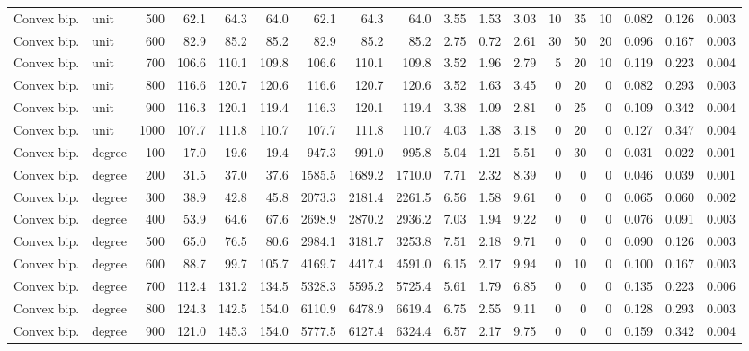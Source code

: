 \begin{tabular}{llr rrr rrr rrr rrr rrr}
Convex bip. & unit & 500 & 62.1 & 64.3 & 64.0 & 62.1 & 64.3 & 64.0 & 3.55 & 1.53 & 3.03 & 10 & 35 & 10 & 0.082 & 0.126 & 0.003 \\
Convex bip. & unit & 600 & 82.9 & 85.2 & 85.2 & 82.9 & 85.2 & 85.2 & 2.75 & 0.72 & 2.61 & 30 & 50 & 20 & 0.096 & 0.167 & 0.003 \\
Convex bip. & unit & 700 & 106.6 & 110.1 & 109.8 & 106.6 & 110.1 & 109.8 & 3.52 & 1.96 & 2.79 & 5 & 20 & 10 & 0.119 & 0.223 & 0.004 \\
Convex bip. & unit & 800 & 116.6 & 120.7 & 120.6 & 116.6 & 120.7 & 120.6 & 3.52 & 1.63 & 3.45 & 0 & 20 & 0 & 0.082 & 0.293 & 0.003 \\
Convex bip. & unit & 900 & 116.3 & 120.1 & 119.4 & 116.3 & 120.1 & 119.4 & 3.38 & 1.09 & 2.81 & 0 & 25 & 0 & 0.109 & 0.342 & 0.004 \\
Convex bip. & unit & 1000 & 107.7 & 111.8 & 110.7 & 107.7 & 111.8 & 110.7 & 4.03 & 1.38 & 3.18 & 0 & 20 & 0 & 0.127 & 0.347 & 0.004 \\
Convex bip. & degree & 100 & 17.0 & 19.6 & 19.4 & 947.3 & 991.0 & 995.8 & 5.04 & 1.21 & 5.51 & 0 & 30 & 0 & 0.031 & 0.022 & 0.001 \\
Convex bip. & degree & 200 & 31.5 & 37.0 & 37.6 & 1585.5 & 1689.2 & 1710.0 & 7.71 & 2.32 & 8.39 & 0 & 0 & 0 & 0.046 & 0.039 & 0.001 \\
Convex bip. & degree & 300 & 38.9 & 42.8 & 45.8 & 2073.3 & 2181.4 & 2261.5 & 6.56 & 1.58 & 9.61 & 0 & 0 & 0 & 0.065 & 0.060 & 0.002 \\
Convex bip. & degree & 400 & 53.9 & 64.6 & 67.6 & 2698.9 & 2870.2 & 2936.2 & 7.03 & 1.94 & 9.22 & 0 & 0 & 0 & 0.076 & 0.091 & 0.003 \\
Convex bip. & degree & 500 & 65.0 & 76.5 & 80.6 & 2984.1 & 3181.7 & 3253.8 & 7.51 & 2.18 & 9.71 & 0 & 0 & 0 & 0.090 & 0.126 & 0.003 \\
Convex bip. & degree & 600 & 88.7 & 99.7 & 105.7 & 4169.7 & 4417.4 & 4591.0 & 6.15 & 2.17 & 9.94 & 0 & 10 & 0 & 0.100 & 0.167 & 0.003 \\
Convex bip. & degree & 700 & 112.4 & 131.2 & 134.5 & 5328.3 & 5595.2 & 5725.4 & 5.61 & 1.79 & 6.85 & 0 & 0 & 0 & 0.135 & 0.223 & 0.006 \\
Convex bip. & degree & 800 & 124.3 & 142.5 & 154.0 & 6110.9 & 6478.9 & 6619.4 & 6.75 & 2.55 & 9.11 & 0 & 0 & 0 & 0.128 & 0.293 & 0.003 \\
Convex bip. & degree & 900 & 121.0 & 145.3 & 154.0 & 5777.5 & 6127.4 & 6324.4 & 6.57 & 2.17 & 9.75 & 0 & 0 & 0 & 0.159 & 0.342 & 0.004 \\

\end{tabular}
